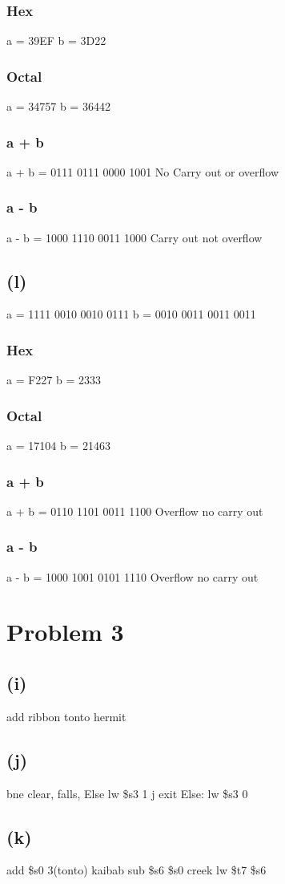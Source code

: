 \documentclass[11pt]{article}
\begin{document}
\subsubsection{Hex}
\label{sec:org03a9e01}
a = 39EF
b = 3D22
\subsubsection{Octal}
\label{sec:org58ee1a1}
a = 34757
b = 36442
\subsubsection{a + b}
\label{sec:orgd4c46df}
a + b = 0111 0111 0000 1001
No Carry out or overflow
\subsubsection{a - b}
\label{sec:org84cb714}
a - b = 1000 1110 0011 1000
Carry out not overflow
\subsection{(l)}
\label{sec:orgfe016dc}
a = 1111 0010 0010 0111
b = 0010 0011 0011 0011
\subsubsection{Hex}
\label{sec:org9d4ba09}
a = F227
b = 2333
\subsubsection{Octal}
\label{sec:orgd00030f}
a = 17104
b = 21463
\subsubsection{a + b}
\label{sec:org2a2eb8a}
a + b = 0110 1101 0011 1100
Overflow no carry out
\subsubsection{a - b}
\label{sec:orgbf4f06b}
a - b = 1000 1001 0101 1110
Overflow no carry out
\section{Problem 3}
\label{sec:org7683817}
\subsection{(i)}
\label{sec:orga8d7e1c}
add ribbon tonto hermit
\subsection{(j)}
\label{sec:org12b1a90}
   bne clear, falls, Else
   lw \$s3 1
   j exit
Else: lw \$s3 0
\subsection{(k)}
\label{sec:org987ee77}
add \$s0 3(tonto) kaibab
sub \$s6 \$s0 creek
lw \$t7 \$s6
\end{document}
